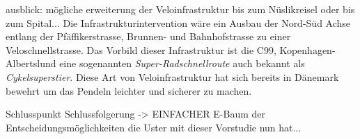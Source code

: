 ausblick: mögliche erweiterung der Veloinfrastruktur bis zum Nüslikreisel oder bis zum Spital... Die Infrastrukturintervention wäre ein Ausbau der Nord-Süd Achse entlang der Pfäffikerstrasse, Brunnen- und Bahnhofstrasse zu einer Veloschnellstrasse. Das Vorbild dieser Infrastruktur ist die C99, Kopenhagen-Albertslund eine sogenannten \textit{Super-Radschnellroute} auch bekannt als \textit{Cykelsuperstier}. Diese Art von Veloinfrastruktur hat sich bereits in Dänemark bewehrt um das Pendeln leichter und sicherer zu machen. 


Schlusspunkt Schlussfolgerung -> EINFACHER E-Baum der Entscheidungsmöglichkeiten die Uster mit dieser Vorstudie nun hat...

%

